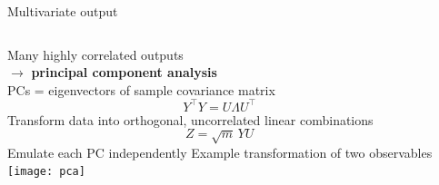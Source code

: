 \documentclass{beamer}
\newcommand{\tran}{^\intercal}
\begin{document}
\begin{frame}{Multivariate output}
  \begin{columns}
    Many highly correlated outputs \\
    $\rightarrow$ \textbf{principal component analysis} \\[1em]
    PCs = eigenvectors of sample covariance matrix
    \begin{equation*}
      Y\tran Y = U \Lambda U\tran
    \end{equation*}
    Transform data into orthogonal, uncorrelated linear combinations
    \begin{equation*}
      Z = \sqrt m \, YU
    \end{equation*}
    Emulate each PC independently
    Example transformation of two observables \\[2ex]
    \texttt{[image: pca]}
  \end{columns}
\end{frame}
\end{document}
